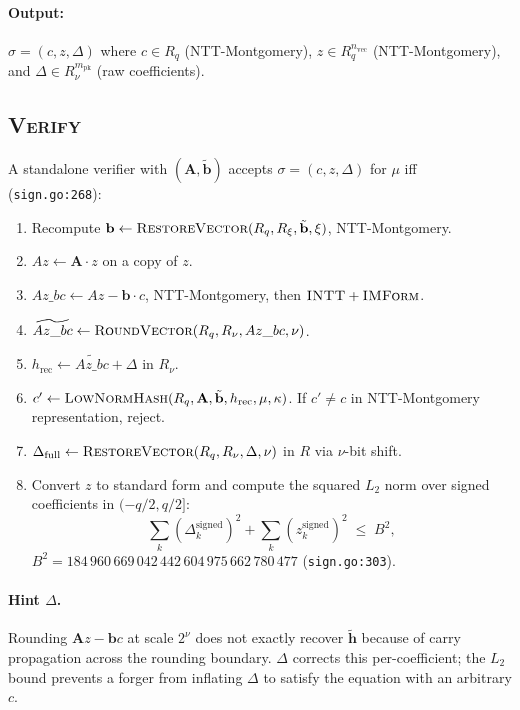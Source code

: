 \paragraph{Output:} $\sigma = (c, z, \Delta)$ where $c \in R_q$
(NTT-Montgomery), $z \in R_q^{n_{\mathrm{vec}}}$ (NTT-Montgomery), and
$\Delta \in R_\nu^{m_{\mathrm{pk}}}$ (raw coefficients).

\subsection{\textsc{Verify}}
\label{sec:protocol:verify}

A standalone verifier with $(\mathbf{A}, \tilde{\mathbf{b}})$ accepts
$\sigma = (c, z, \Delta)$ for $\mu$ iff (\texttt{sign.go:268}):

\begin{enumerate}[leftmargin=2em, nosep]
\item Recompute $\mathbf{b} \leftarrow \textsc{RestoreVector}(R_q,
      R_\xi, \tilde{\mathbf{b}}, \xi)$, NTT-Montgomery.
\item $Az \leftarrow \mathbf{A} \cdot z$ on a copy of $z$.
\item $Az\_bc \leftarrow Az - \mathbf{b} \cdot c$, NTT-Montgomery,
      then $\textsc{INTT} + \textsc{IMForm}$.
\item $\widetilde{Az\_bc} \leftarrow \textsc{RoundVector}(R_q, R_\nu,
      Az\_bc, \nu)$.
\item $h_{\mathrm{rec}} \leftarrow \widetilde{Az\_bc} + \Delta$ in
      $R_\nu$.
\item $c' \leftarrow \textsc{LowNormHash}(R_q, \mathbf{A},
      \tilde{\mathbf{b}}, h_{\mathrm{rec}}, \mu, \kappa)$. If
      $c' \neq c$ in NTT-Montgomery representation, reject.
\item $\Delta_{\mathrm{full}} \leftarrow \textsc{RestoreVector}(R_q,
      R_\nu, \Delta, \nu)$ in $R$ via $\nu$-bit shift.
\item Convert $z$ to standard form and compute the squared $L_2$ norm
      over signed coefficients in $(-q/2, q/2]$:
      \[
        \sum_k (\Delta_k^{\mathrm{signed}})^2
        + \sum_k (z_k^{\mathrm{signed}})^2 \;\leq\; B^2,
      \]
      $B^2 = 184\,960\,669\,042\,442\,604\,975\,662\,780\,477$
      \cite{dilithium} (\texttt{sign.go:303}).
\end{enumerate}

\paragraph{Hint $\Delta$.} Rounding $\mathbf{A}z - \mathbf{b}c$ at
scale $2^\nu$ does not exactly recover $\tilde{\mathbf{h}}$ because of
carry propagation across the rounding boundary. $\Delta$ corrects this
per-coefficient; the $L_2$ bound prevents a forger from inflating
$\Delta$ to satisfy the equation with an arbitrary $c$.

